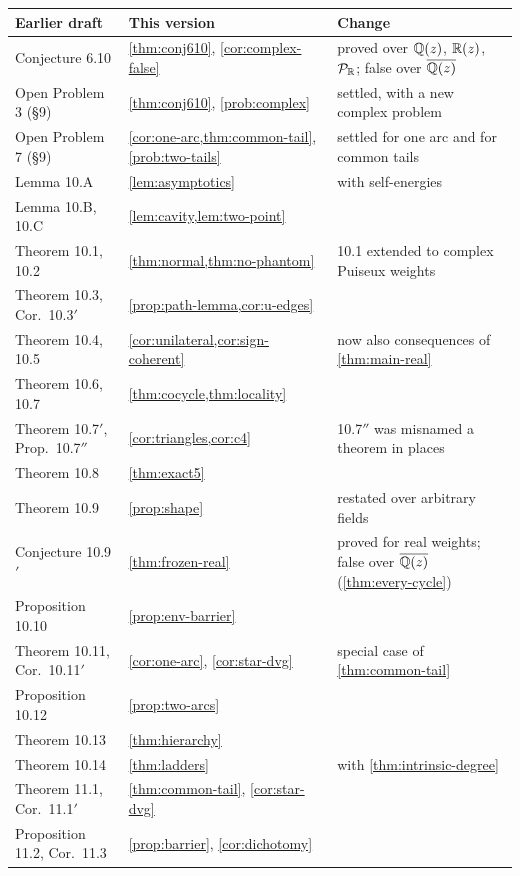 \begin{center}\small
\begin{longtable}{@{}L{0.29}L{0.33}L{0.31}@{}}
\toprule
Earlier draft & This version & Change\\ \midrule\endhead
Conjecture 6.10 & \cref{thm:conj610}, \cref{cor:complex-false} & proved over $\mathbb{Q}(z)$, $\mathbb{R}(z)$, $\mathcal{P}_{\mathbb{R}}$; false over $\overline{\mathbb{Q}(z)}$\\
Open Problem 3 (\S9) & \cref{thm:conj610}, \cref{prob:complex} & settled, with a new complex problem\\
Open Problem 7 (\S9) & \cref{cor:one-arc,thm:common-tail}, \cref{prob:two-tails} & settled for one arc and for common tails\\
Lemma 10.A & \cref{lem:asymptotics} & with self-energies\\
Lemma 10.B, 10.C & \cref{lem:cavity,lem:two-point} & \\
Theorem 10.1, 10.2 & \cref{thm:normal,thm:no-phantom} & 10.1 extended to complex Puiseux weights\\
Theorem 10.3, Cor.\ 10.3$'$ & \cref{prop:path-lemma,cor:u-edges} & \\
Theorem 10.4, 10.5 & \cref{cor:unilateral,cor:sign-coherent} & now also consequences of \cref{thm:main-real}\\
Theorem 10.6, 10.7 & \cref{thm:cocycle,thm:locality} & \\
Theorem 10.7$'$, Prop.\ 10.7$''$ & \cref{cor:triangles,cor:c4} & 10.7$''$ was misnamed a theorem in places\\
Theorem 10.8 & \cref{thm:exact5} & \\
Theorem 10.9 & \cref{prop:shape} & restated over arbitrary fields\\
Conjecture 10.9$'$ & \cref{thm:frozen-real} & proved for real weights; false over $\overline{\mathbb{Q}(z)}$ (\cref{thm:every-cycle})\\
Proposition 10.10 & \cref{prop:env-barrier} & \\
Theorem 10.11, Cor.\ 10.11$'$ & \cref{cor:one-arc}, \cref{cor:star-dvg} & special case of \cref{thm:common-tail}\\
Proposition 10.12 & \cref{prop:two-arcs} & \\
Theorem 10.13 & \cref{thm:hierarchy} & \\
Theorem 10.14 & \cref{thm:ladders} & with \cref{thm:intrinsic-degree}\\
Theorem 11.1, Cor.\ 11.1$'$ & \cref{thm:common-tail}, \cref{cor:star-dvg} & \\
Proposition 11.2, Cor.\ 11.3 & \cref{prop:barrier}, \cref{cor:dichotomy} & \\

\end{longtable}
\end{center}
